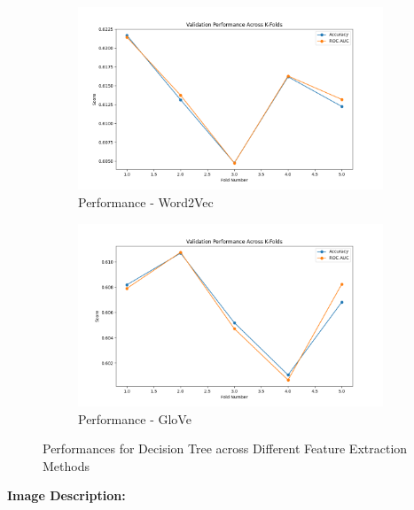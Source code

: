 \begin{figure}[H]
    \begin{subfigure}[b]{0.44\textwidth}
        \includegraphics[width=\textwidth]{img/report_info/img/1.2.DecisionTree/best_decision_tree_word2vec.png}
        \caption{Performance - Word2Vec}
        \label{fig:lr-word2vec}
    \end{subfigure}
    \begin{subfigure}[b]{0.44\textwidth}
        \includegraphics[width=\textwidth]{img/report_info/img/1.2.DecisionTree/best_decision_tree_glove.png}
        \caption{Performance - GloVe}
        \label{fig:lr-glove}
    \end{subfigure}
    
    \caption{Performances for Decision Tree across Different Feature Extraction Methods}
    \label{fig:lr-performance-group}
\end{figure}

\textbf{Image Description:}

